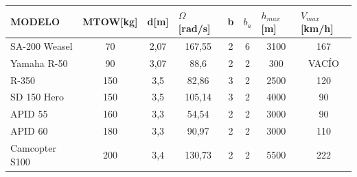 \begin{table}[htbp]
	\centering
	\begin{tabular}{|l|c|c|c|c|c|c|c|}
		\hline
		\rowcolor[rgb]{ .851,  .851,  .851} MODELO & \multicolumn{1}{l|}{MTOW[kg]} & \multicolumn{1}{l|}{d[m]} & \multicolumn{1}{l|}{$\Omega$ [rad/s]} & \multicolumn{1}{l|}{b} & \multicolumn{1}{l|}{$b_a$} & \multicolumn{1}{l|}{$h_{max}$[m]} & \multicolumn{1}{l|}{$V_{max}$[km/h]} \\ \hline
		\rowcolor[rgb]{ .949,  .949,  .949} SA-200 Weasel & \cellcolor[rgb]{ 1,  1,  1}70 & \cellcolor[rgb]{ 1,  1,  1}2,07 & \cellcolor[rgb]{ 1,  1,  1}167,55 & \cellcolor[rgb]{ 1,  1,  1}2 & \cellcolor[rgb]{ 1,  1,  1}6 & \cellcolor[rgb]{ 1,  1,  1}3100 & \cellcolor[rgb]{ 1,  1,  1}167 \\
		\hline
		\rowcolor[rgb]{ .949,  .949,  .949} Yamaha R-50 & \cellcolor[rgb]{ 1,  1,  1}90 & \cellcolor[rgb]{ 1,  1,  1}3,07 & \cellcolor[rgb]{ 1,  1,  1}88,6 & \cellcolor[rgb]{ 1,  1,  1}2 & \cellcolor[rgb]{ 1,  1,  1}2 & \cellcolor[rgb]{ 1,  1,  1}300 & \cellcolor[rgb]{ 1,  1,  1}VACÍO \\
		\hline
		\rowcolor[rgb]{ .949,  .949,  .949} R-350 & \cellcolor[rgb]{ 1,  1,  1}150 & \cellcolor[rgb]{ 1,  1,  1}3,5 & \cellcolor[rgb]{ 1,  1,  1}82,86 & \cellcolor[rgb]{ 1,  1,  1}3 & \cellcolor[rgb]{ 1,  1,  1}2 & \cellcolor[rgb]{ 1,  1,  1}2500 & \cellcolor[rgb]{ 1,  1,  1}120 \\
		\hline
		\rowcolor[rgb]{ .949,  .949,  .949} SD 150 Hero & \cellcolor[rgb]{ 1,  1,  1}150 & \cellcolor[rgb]{ 1,  1,  1}3,5 & \cellcolor[rgb]{ 1,  1,  1}105,14 & \cellcolor[rgb]{ 1,  1,  1}3 & \cellcolor[rgb]{ 1,  1,  1}2 & \cellcolor[rgb]{ 1,  1,  1}4000 & \cellcolor[rgb]{ 1,  1,  1}90 \\
		\hline
		\rowcolor[rgb]{ .949,  .949,  .949} APID 55 & \cellcolor[rgb]{ 1,  1,  1}160 & \cellcolor[rgb]{ 1,  1,  1}3,3 & \cellcolor[rgb]{ 1,  1,  1}54,54 & \cellcolor[rgb]{ 1,  1,  1}2 & \cellcolor[rgb]{ 1,  1,  1}2 & \cellcolor[rgb]{ 1,  1,  1}3000 & \cellcolor[rgb]{ 1,  1,  1}90 \\
		\hline
		\rowcolor[rgb]{ .949,  .949,  .949} APID 60 & \cellcolor[rgb]{ 1,  1,  1}180 & \cellcolor[rgb]{ 1,  1,  1}3,3 & \cellcolor[rgb]{ 1,  1,  1}90,97 & \cellcolor[rgb]{ 1,  1,  1}2 & \cellcolor[rgb]{ 1,  1,  1}2 & \cellcolor[rgb]{ 1,  1,  1}3000 & \cellcolor[rgb]{ 1,  1,  1}110 \\
		\hline
		\rowcolor[rgb]{ .949,  .949,  .949} Camcopter S100 & \cellcolor[rgb]{ 1,  1,  1}200 & \cellcolor[rgb]{ 1,  1,  1}3,4 & \cellcolor[rgb]{ 1,  1,  1}130,73 & \cellcolor[rgb]{ 1,  1,  1}2 & \cellcolor[rgb]{ 1,  1,  1}2 & \cellcolor[rgb]{ 1,  1,  1}5500 & \cellcolor[rgb]{ 1,  1,  1}222 \\

\end{tabular}
\end{table}
